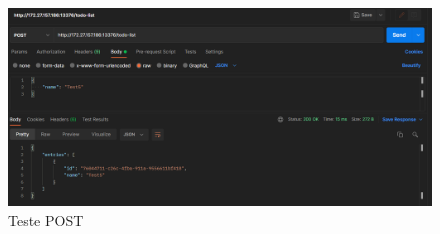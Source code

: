 \documentclass[a4paper, 11pt]{scrartcl}
\begin{document}
\begin{figure}[H]
    \begin{center}
        \includegraphics[scale=0.4]{Bilder/api_postman_test_post.png}
        \caption{Teste POST}\label{pic:api_postman_test_post}
    \end{center}
\end{figure}
\end{document}
